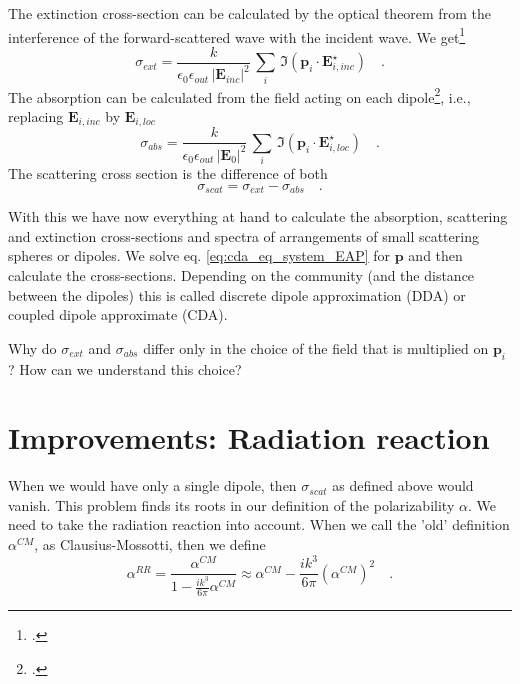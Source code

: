 The extinction cross-section can be calculated by the optical theorem from the interference of the forward-scattered wave with the incident wave. We get\footcite{Draine88,Yurkin07}
\begin{equation}
\sigma_{ext} = \frac{k}{\epsilon_0 \epsilon_{out}  \, |\mathbf{E}_{inc}|^2} \, \sum_i \, \Im ( \mathbf{p}_i \cdot \mathbf{E}_{i, inc}^\star ) \quad .
\end{equation}
 The absorption can be calculated from the field acting on each dipole\footcite{Yurkin07}, i.e., replacing $\mathbf{E}_{i, inc} $ by $\mathbf{E}_{i, loc} $ 
 \begin{equation}
\sigma_{abs} = \frac{k}{\epsilon_0 \epsilon_{out}  \, |\mathbf{E}_{0}|^2} \, \sum_i \, \Im ( \mathbf{p}_i \cdot \mathbf{E}_{i, loc}^\star ) \quad .
\end{equation}
The scattering cross section is the difference of both
\begin{equation}
\sigma_{scat} = \sigma_{ext}  - \sigma_{abs} \quad .
\end{equation}
 
With this we have now everything at hand to calculate the absorption, scattering and extinction cross-sections and spectra of arrangements  of small scattering spheres or dipoles. We solve eq. \ref{eq:cda_eq_system_EAP} for $\mathbf{p}$ and then calculate the cross-sections. Depending on the community (and the distance between the dipoles) this is called discrete dipole approximation (DDA) or coupled dipole approximate (CDA).
 
 
\begin{questions}
\item Why do $\sigma_{ext}$ and $\sigma_{abs}$ differ only in  the choice of the field that is multiplied on $\mathbf{p}_i$? How can we understand this choice?
\end{questions}

 
\section{Improvements: Radiation reaction} 

When we would have only a single dipole, then $\sigma_{scat}$ as defined above would vanish. This problem finds its roots in our definition of the polarizability $\alpha$. We need to take the radiation reaction into account. When we call the 'old' definition $\alpha^{CM}$, as Clausius-Mossotti, then we define 
\begin{equation}
\alpha^{RR} = \frac{\alpha^{CM}}{1 - \frac{i k^3}{6 \pi} \alpha^{CM}}
\approx
\alpha^{CM} -  \frac{i k^3}{6 \pi} \left(\alpha^{CM}\right)^2 \quad .
\end{equation}

